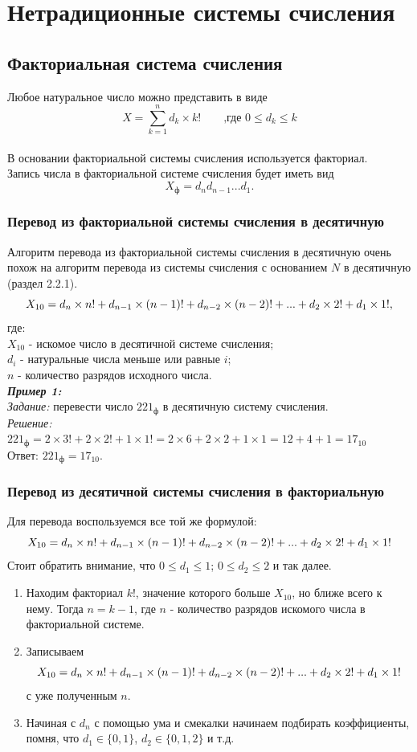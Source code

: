 \section{Нетрадиционные системы счисления}
\subsection{Факториальная система счисления}
Любое натуральное число можно представить в виде $$ X = \sum^{n}_{k = 1} d_{k}\times k! \qquad \mbox{,где  } 0 \leqslant d_{k} \leqslant k $$
\\В основании факториальной системы счисления используется факториал.
\\Запись числа в факториальной системе счисления будет иметь вид $$X_{\mbox{ф}} = d_{n}d_{n-1}...d_{1}.$$

\subsubsection{Перевод из факториальной системы счисления в десятичную}
Алгоритм перевода из факториальной системы счисления в десятичную очень похож на алгоритм перевода из системы счисления с основанием $N$ в десятичную (раздел 2.2.1).
$$ X_{10} = d_{n}\times n! + d_{n-1}\times (n-1)! + d_{n-2}\hm\times (n-2)!\hm + ...\hm + d_{2}\times 2! + d_{1}\times 1!,$$
где:
\\$X_{10}$ - искомое число в десятичной системе счисления;
\\$d_{i}$ - натуральные числа меньше или равные $i$;
\\$n$ - количество разрядов исходного числа.
\\
\emph{\textbf{Пример 1:}}
\\\emph{Задание:} перевести число $221_{\mbox{ф}}$ в десятичную систему счисления.
\\\emph{Решение:} $221_{\mbox{ф}} = 2\times 3! + 2\times 2! + 1\times 1! = 2\times 6 + 2\times 2 + 1\times 1 = 12 + 4 + 1 = 17_{10}$
\\Ответ:  $221_{\mbox{ф}} = 17_{10}$.
\subsubsection{Перевод из десятичной системы счисления в факториальную}
Для перевода воспользуемся все той же формулой:
$$ X_{10} = d_{n}\times n! + d_{n-1}\times (n-1)! + d_{n-2}\hm\times (n-2)!\hm + ...\hm + d_{2}\times 2! + d_{1}\times 1!$$
Стоит обратить внимание, что $0 \leqslant d_{1}\leqslant 1$; $0 \leqslant d_{2}\leqslant 2$ и так далее.
\begin{enumerate}
\item Находим факториал $k!$, значение которого больше $X_{10}$, но ближе всего к нему. Тогда $n = k - 1$, где $n$ - количество разрядов искомого числа в факториальной системе.
\item Записываем $$ X_{10} = d_{n}\times n! + d_{n-1}\times (n-1)! + d_{n-2}\hm\times (n-2)!\hm + ...\hm + d_{2}\times 2! + d_{1}\times 1!$$ с уже полученным $n$.
\item Начиная с $d_{n}$ с помощью ума и смекалки начинаем подбирать коэффициенты, помня, что $d_{1} \in \{0,1\}$, $d_{2} \in \{0,1,2\}$ и т.д.
\end{enumerate}

